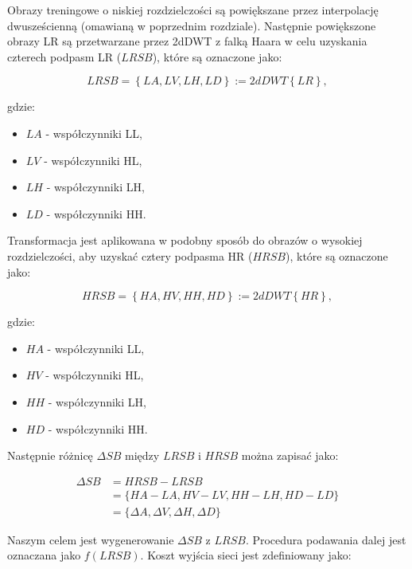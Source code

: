 Obrazy treningowe o niskiej rozdzielczości są powiększane przez interpolację dwusześcienną (omawianą w poprzednim rozdziale). Następnie powiększone obrazy LR są przetwarzane przez 2dDWT z falką Haara w celu uzyskania czterech podpasm LR ($LRSB$), które są oznaczone jako:

\begin{equation}
    L R S B = \left\{ LA, LV, LH, LD \right\} := 2dDWT\left\{LR\right\}, \label{eq:3.2}
\end{equation}

gdzie:
\begin{itemize}
    \item $LA$ - współczynniki LL,
    \item $LV$ - współczynniki HL,
    \item $LH$ - współczynniki LH,
    \item $LD$ - współczynniki HH.
\end{itemize}


\newpage
Transformacja jest aplikowana w podobny sposób do obrazów o wysokiej rozdzielczości, aby uzyskać cztery podpasma HR ($HRSB$), które są oznaczone jako:

\begin{equation}
    H R S B = \left\{ HA, HV, HH, HD \right\} := 2dDWT\left\{HR\right\}, \label{eq:3.3}
\end{equation}

gdzie:
\begin{itemize}
    \item $HA$ - współczynniki LL,
    \item $HV$ - współczynniki HL,
    \item $HH$ - współczynniki LH,
    \item $HD$ - współczynniki HH.
\end{itemize}

Następnie różnicę $\Delta SB$ między $LRSB$ i $HRSB$ można zapisać jako:

\begin{equation}
    \begin{aligned}
    \Delta SB   & ={H R S B} - {L R S B} \\
                & =\{{HA}-{LA}, {HV}-{LV}, {HH}-{LH}, {HD}-{LD}\} \\
                & =\{\Delta {A}, \Delta {V}, \Delta {H}, \Delta {D}\}
    \end{aligned}
    \label{eq:3.4}
\end{equation}

Naszym celem jest wygenerowanie $\Delta SB$ z $LRSB$. Procedura podawania dalej jest oznaczana jako $f(LRSB)$. Koszt wyjścia sieci jest zdefiniowany jako:

